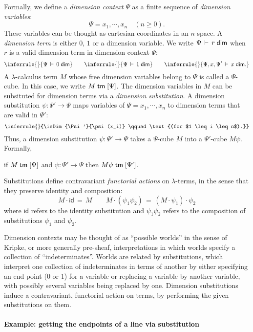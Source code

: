 \documentclass{article}
\begin{document}
Formally, we define a \emph{dimension context} $\Psi$ as a finite
sequence of \emph{dimension variables}:
\[ \Psi = x_1, \cdots, x_n \quad (n \geq 0).  \] These variables can
be thought as cartesian coordinates in an $n$-space.  A
\emph{dimension term} is either $0$, $1$ or a dimension variable. We
write $\Psi \,\vdash\, r \;\mathsf{dim}$ when $r$ is a valid dimension term in
dimension context $\Psi$:
\[
  \inferrule{}{\isDim{\Psi}{0}} \qquad \inferrule{}{\isDim{\Psi}{1}}
  \qquad \inferrule{}{\isDim{\Psi, x, \Psi'}{x}.}
\]
A $\lambda$-calculus term $M$ whose free dimension variables belong to
$\Psi$ is called a $\Psi$-cube. In this case, we write
$M \; \mathsf{tm} \; [\Psi]$. The dimension variables in $M$ can be subsituted for
dimension terms via a \emph{dimension substitution}. A dimension
substitution $\psi : \Psi' \to \Psi$ maps variables of
$\Psi = x_1, \cdots, x_n $ to dimension terms that are valid in
$\Psi'$:
\[
  \inferrule{}{\isDim{\Psi'}{\psi(x_i)} \qquad \text{(for
      $1 \leq i \leq n$).}}
\]
Thus, a dimension substitution $\psi : \Psi' \to \Psi$ takes a
$\Psi$-cube $M$ into a $\Psi'$-cube $M \psi$. Formally,
\begin{center}
  if $M \; \mathsf{tm} \; [\Psi]$ and $\psi : \Psi' \to \Psi$ then
  $M \psi \; \mathsf{tm} \; [\Psi']$.
\end{center}
Substitutions define contravariant \emph{functorial actions} on
$\lambda$-terms, in the sense that they preserve identity and
composition:
\[ M \cdot \textsf{id} \,=\, M \qquad M \cdot (\psi_1 \psi_2) \,=\,
  (M \cdot \psi_1) \cdot \psi_2 \] where $\textsf{id}$ refers to the
identity substitution and $\psi_1 \psi_2$ refers to the composition
of substitutions $\psi_1$ and $\psi_2$.

Dimension contexts may be thought of as ``possible worlds'' in the sense of Kripke, or more generally
pre-sheaf, interpretations in which worlds specify a collection of ``indeterminates''.  Worlds are related by
substitutions, which interpret one collection of indeterminates in terms of another by either specifying an
end point (0 or 1) for a variable or replacing a variable by another variable, with possibly several variables
being replaced by one.  Dimension substitutions induce a contravariant, functorial action on terms, by
performing the given substitutions on them.

\paragraph{Example: getting the endpoints of a line via substitution}
\end{document}
